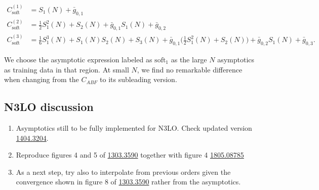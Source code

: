 \documentclass[12pt]{article}
\begin{document}
\begin{align}
	C_{\textrm{soft}}^{(1)} &= S_{1}(N) + \bar{g}_{0, 1} \\
	C_{\textrm{soft}}^{(2)} &= \frac{1}{2}S_{1}^{2}(N) + S_{2}(N) + \bar{g}_{0, 1}S_{1}(N) + \bar{g}_{0, 2} \\
	C_{\textrm{soft}}^{(3)} &= \frac{1}{6}S_{1}^{3}(N) + S_{1}(N)S_{2}(N) + S_{3}(N) + \bar{g}_{0, 1}\bigg( \frac{1}{2}S_{1}^{2}(N) + S_{2}(N) \bigg) + \bar{g}_{0, 2}S_{1}(N) + \bar{g}_{0, 3}.
\end{align}

We choose the asymptotic expression labeled as $\textrm{soft}_{1}$ as the large $N$ asymptotics as training data in that region. At small $N$, we find no remarkable difference when changing from the $C_{ABF}$ to its subleading version.

\subsection{N3LO discussion}
\begin{enumerate}
	\item Asymptotics still to be fully implemented for N3LO. Check updated version \href{https://arxiv.org/abs/1404.3204}{1404.3204}. 
	\item Reproduce figures 4 and 5 of \href{https://arxiv.org/abs/1303.3590}{1303.3590} together with figure 4
	\href{https://arxiv.org/pdf/1805.08785.pdf}{1805.08785}
	\item As a next step, try also to interpolate from previous orders given the convergence shown in figure 8 of \href{https://arxiv.org/abs/1303.3590}{1303.3590} rather from the asymptotics.	
\end{enumerate}

\newpage
\end{document}
